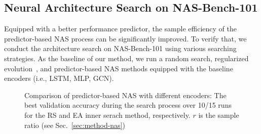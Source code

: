 \documentclass[runningheads]{llncs}
\begin{document}
\subsection{Neural Architecture Search on NAS-Bench-101}
\label{sec:exp-nas-nb101}

Equipped with a better performance predictor, the sample efficiency of the predictor-based NAS process can be significantly improved. To verify that, we conduct the architecture search on NAS-Bench-101 using various searching strategies. As the baseline of our method, 
we run a random search, regularized evolution~\cite{real2019regularized},
and predictor-based NAS methods equipped with the baseline encoders (i.e., LSTM, MLP, GCN).



\begin{figure}[bt]
  \vspace{-5pt}
\caption{Comparison of predictor-based NAS with different encoders: The best validation accuracy during the search process over 10/15 runs for the RS and EA inner serach method, respectively. $r$ is the sample ratio (see Sec.~\ref{sec:method-nas})}
\label{fig:accs_under_archs}
\end{figure}
\end{document}
